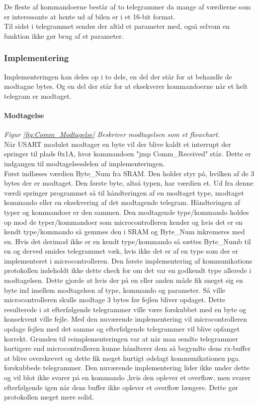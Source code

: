 De fleste af kommandoerne består af to telegrammer da mange af værdierne som er interessante at hente ud af bilen er i et 16-bit format.\\
Til sidst i telegrammet sendes der altid et parameter med, også selvom en funktion ikke gør brug af et parameter.

\subsubsection{Implementering}
Implementeringen kan deles op i to dele, en del der står for at behandle de modtagne bytes. Og en del der står for at eksekverer kommandoerne når et helt telegram er modtaget. 

\paragraph{Modtagelse}
\textit{Figur \ref{fig:Comm_Modtagelse} Beskriver modtagelsen som et flowchart.} \\
Når USART modulet modtager en byte vil der blive kaldt et interrupt der springer til plads 0x1A, hvor kommandoen "jmp Comm\_Received" står. Dette er indgangen til modtagelsesdelen af implementeringen. \\
Først indlæses værdien Byte\_Num fra SRAM. Den holder styr på, hvilken af de 3 bytes der er modtaget. Den første byte, altså typen, har værdien et. Ud fra denne værdi springer programmet så til håndteringen af en modtaget type, modtaget kommando eller en eksekvering af det modtagende telegram. Håndteringen af typer og kommandoer er den sammen. Den modtagende type/kommando holdes op mod de typer/kommandoer som microcontrolleren kender og hvis det er en kendt type/kommando så gemmes den i SRAM og Byte\_Num inkremeres med en. Hvis det derimod ikke er en kendt type/kommando så sættes Byte\_Numb til en og derved smides telegrammet væk, hvis ikke det er af en type som der er implementeret i microcontrolleren. Den første implementering af kommunikations protokollen indeholdt ikke dette check for om det var en godkendt type allerede i modtagelsen. Dette gjorde at hvis der på en eller anden måde fik sneget sig en byte ind imellem modtagelsen af type, kommando og parameter. Så ville microcontrolleren skulle modtage 3 bytes før fejlen bliver opdaget. Dette resulterede i at efterfølgende telegrammer ville være forskubbet med en byte og konsekvent ville fejle. Med den nuværende implementering vil microcontrolleren opdage fejlen med det samme og efterfølgende telegrammer vil blive opfanget korrekt. Grunden til reimplementeringen var at når man sendte telegrammer hurtigere end microcontrolleren kunne håndterer dem så begyndte dens rx-buffer at blive overskrevet og dette fik meget hurtigt ødelagt kommunikationen pga. forskubbede telegrammer. Den nuværende implementering lider ikke under dette og vil blot ikke svarer på en kommando ,hvis den oplever et overflow, men svarer efterfølgende igen når dens buffer ikke oplever et overflow længere. Dette gør protokollen meget mere solid.

